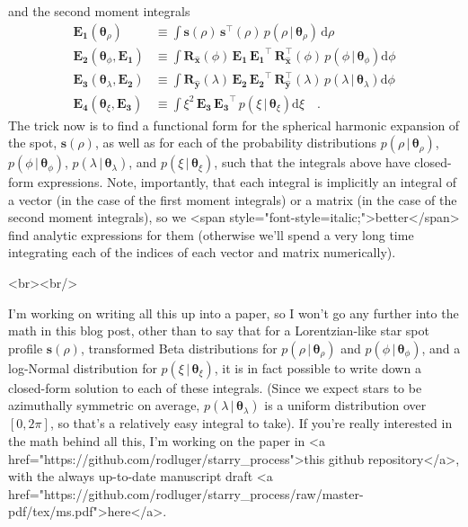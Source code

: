 and the second moment integrals
\begin{align}
    \label{eq:E1}
    \mathbf{E_1}(\pmb{\theta}_\rho)
     & \equiv
    \int
    \mathbf{s}(\rho) \, \mathbf{s}^\top(\rho) \,
    p(\rho \, \big| \, \pmb{\theta}_{\rho}) \,
    \mathrm{d}\rho
    \\[1em]
    \label{eq:E2}
    \mathbf{E_2}(\pmb{\theta}_\phi, \mathbf{E_1})
     & \equiv
    \int
    \mathbf{R}_{\hat{\mathbf{x}}}(\phi) \,
    \mathbf{E_1} \,
    \mathbf{E_1}^\top \,
    \mathbf{R}_{\hat{\mathbf{x}}}^\top(\phi) \,
    p(\phi \, \big| \, \pmb{\theta}_{\phi})
    \mathrm{d}\phi
    \\[1em]
    \label{eq:E3}
    \mathbf{E_3}(\pmb{\theta}_\lambda, \mathbf{E_2})
     & \equiv
    \int
    \mathbf{R}_{\hat{\mathbf{y}}}(\lambda) \,
    \mathbf{E_2} \,
    \mathbf{E_2}^\top \,
    \mathbf{R}_{\hat{\mathbf{y}}}^\top(\lambda) \,
    p(\lambda \, \big| \, \pmb{\theta}_{\lambda})
    \mathrm{d}\phi
    \\[1em]
    \label{eq:E4}
    \mathbf{E_4}(\pmb{\theta}_\xi, \mathbf{E_3})
     & \equiv
    \int
    \xi^2 \,
    \mathbf{E_3} \,
    \mathbf{E_3}^\top \,
    p(\xi \, \big| \, \pmb{\theta}_\xi)
    \mathrm{d}\xi
    \quad.
\end{align}
The trick now is to find a functional form for the spherical harmonic expansion
of the spot, $\mathbf{s}(\rho)$, as well as for each of the probability
distributions
$p(\rho \, \big| \, \pmb{\theta}_{\rho})$,
$p(\phi \, \big| \, \pmb{\theta}_{\phi})$,
$p(\lambda \, \big| \, \pmb{\theta}_{\lambda})$,
and
$p(\xi \, \big| \, \pmb{\theta}_\xi)$,
such that the integrals above have closed-form expressions.
Note, importantly, that each integral is implicitly an integral of a vector
(in the case of the first moment integrals) or a matrix (in the case
of the second moment integrals), so we <span style="font-style=italic;">better</span>
find analytic expressions for them (otherwise we'll spend a very long time
integrating each of the indices of each vector and matrix numerically).

<br><br/>

I'm working on writing all this up into a paper, so I won't go any further into
the math in this blog post, other than to say that for a Lorentzian-like
star spot profile $\mathbf{s}(\rho)$, transformed Beta distributions for
$p(\rho \, \big| \, \pmb{\theta}_{\rho})$ and $p(\phi \, \big| \, \pmb{\theta}_{\phi})$,
and a log-Normal distribution for $p(\xi \, \big| \, \pmb{\theta}_\xi)$,
it is in fact possible to write down a closed-form solution to each of these
integrals. (Since we expect stars to be azimuthally symmetric on average,
$p(\lambda \, \big| \, \pmb{\theta}_{\lambda})$ is a uniform distribution over
$[0, 2\pi]$, so that's a relatively easy integral to take). If you're really
interested in the math behind all this, I'm working on the paper in
<a href="https://github.com/rodluger/starry_process">this github repository</a>,
with the always up-to-date manuscript draft
<a href="https://github.com/rodluger/starry_process/raw/master-pdf/tex/ms.pdf">here</a>.